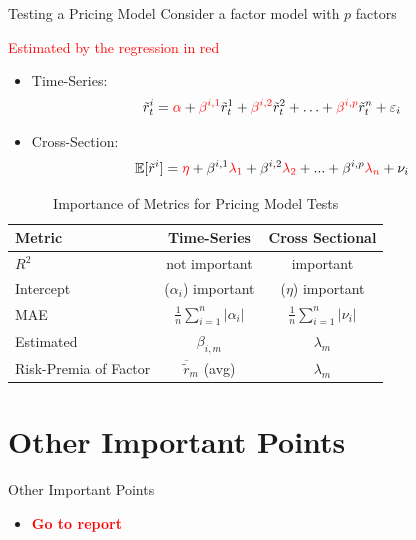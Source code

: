 \documentclass{beamer}
\newcommand{\highlightred}[1]{\textcolor{red}{\textbf{#1}}}
\begin{document}
\begin{frame}{Testing a Pricing Model}
    Consider a factor model with $p$ factors

    \textcolor{red}{Estimated by the regression in red}
    \begin{itemize}
        \item Time-Series: \[
            \tilde{r}^i_t=\textcolor{red}{\alpha}+\textcolor{red}{\beta^{i, 1}} \tilde{r}^1_t+\textcolor{red}{\beta^{i, 2}} \tilde{r}^2_t+\ldots+\textcolor{red}{\beta^{i, p}} \tilde{r}^n_t+\varepsilon_i
            \]
        \item Cross-Section: \[
            \mathbb{E}[\tilde{r}^i]=\textcolor{red}{\eta}+\beta^{i, 1}\textcolor{red}{\lambda_{1}}+\beta^{i, 2}\textcolor{red}{\lambda_{2}}+...+\beta^{i, p}\textcolor{red}{\lambda_{n}}+\nu_i
            \]
    \end{itemize}
    \begin{table}[h]
        \centering
        \begin{tabular}{|l|c|c|}
            \hline
            \textbf{Metric} & \textbf{Time-Series} & \textbf{Cross Sectional} \\ \hline
            $R^2$ & not important & important \\ \hline
            Intercept & ($\alpha_i$) important & ($\eta$) important \\ \hline
            MAE & $\frac{1}{n} \sum_{i=1}^{n} | \alpha_i |$ & $\frac{1}{n}  \sum_{i=1}^{n} | \nu_i |$ \\ \hline
            Estimated & $\beta_{i, m}$ & $\lambda_m$ \\ \hline
            Risk-Premia of Factor & $\overline{\tilde{r}}_m$ (avg) & $\lambda_m$ \\ \hline
        \end{tabular}
        \caption{Importance of Metrics for Pricing Model Tests}
        \label{tab:importance_of_metrics}
    \end{table}
\end{frame}

\section{Other Important Points}
\begin{frame}{Other Important Points}
    \begin{itemize}
        \item \highlightred{Go to report}
    \end{itemize}
\end{frame}
\end{document}

